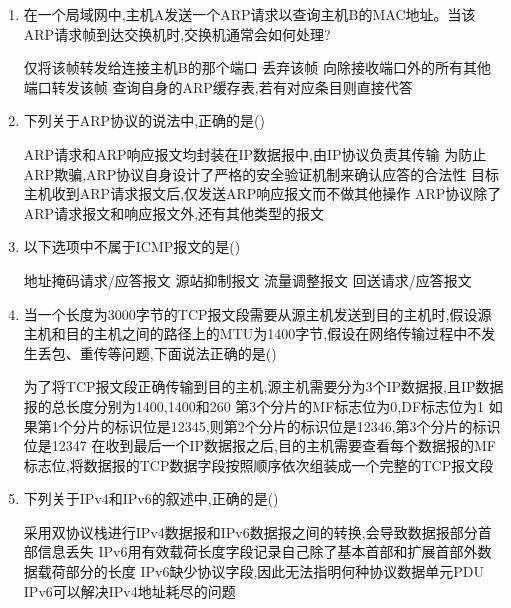 \documentclass[12pt, a4paper, oneside, UTF8]{ctexbook}
\begin{document}
\begin{enumerate}
    \item 在一个局域网中,主机A发送一个ARP请求以查询主机B的MAC地址。当该ARP请求帧到达交换机时,交换机通常会如何处理?
    \begin{choices}[1]
    \task 仅将该帧转发给连接主机B的那个端口
    \task 丢弃该帧
    \task 向除接收端口外的所有其他端口转发该帧
    \task 查询自身的ARP缓存表,若有对应条目则直接代答
    \end{choices}

    \item 下列关于ARP协议的说法中,正确的是(\qquad)
    \begin{choices}[1]
    \task ARP请求和ARP响应报文均封装在IP数据报中,由IP协议负责其传输
    \task 为防止ARP欺骗,ARP协议自身设计了严格的安全验证机制来确认应答的合法性
    \task 目标主机收到ARP请求报文后,仅发送ARP响应报文而不做其他操作
    \task ARP协议除了ARP请求报文和响应报文外,还有其他类型的报文
    \end{choices}

    \item 以下选项中不属于ICMP报文的是(\qquad)
    \begin{choices}[2]
    \task 地址掩码请求/应答报文
    \task 源站抑制报文
    \task 流量调整报文
    \task 回送请求/应答报文
    \end{choices}

    \item 当一个长度为3000字节的TCP报文段需要从源主机发送到目的主机时,假设源主机和目的主机之间的路径上的MTU为1400字节,假设在网络传输过程中不发生丢包、重传等问题,下面说法正确的是(\qquad)
    \begin{choices}[1]
    \task 为了将TCP报文段正确传输到目的主机,源主机需要分为3个IP数据报,且IP数据报的总长度分别为1400,1400和260
    \task 第3个分片的MF标志位为0,DF标志位为1
    \task 如果第1个分片的标识位是12345,则第2个分片的标识位是12346,第3个分片的标识位是12347
    \task 在收到最后一个IP数据报之后,目的主机需要查看每个数据报的MF标志位,将数据报的TCP数据字段按照顺序依次组装成一个完整的TCP报文段
    \end{choices}

    \item 下列关于IPv4和IPv6的叙述中,正确的是(\qquad)
    \begin{choices}[1]
    \task 采用双协议栈进行IPv4数据报和IPv6数据报之间的转换,会导致数据报部分首部信息丢失
    \task IPv6用有效载荷长度字段记录自己除了基本首部和扩展首部外数据载荷部分的长度
    \task IPv6缺少协议字段,因此无法指明何种协议数据单元PDU
    \task IPv6可以解决IPv4地址耗尽的问题
    \end{choices}


\end{enumerate}
\end{document}
